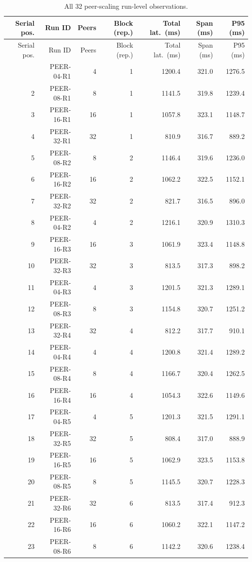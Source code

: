 \begin{longtable}{rrrrrrr}
\caption{All 32 peer-scaling run-level observations.}\label{tab:s7}\\
\toprule
Serial pos. & Run ID & Peers & Block (rep.) & Total lat.\ (ms) & Span (ms) & P95 (ms) \\
\midrule
\endfirsthead
\toprule
Serial pos. & Run ID & Peers & Block (rep.) & Total lat.\ (ms) & Span (ms) & P95 (ms) \\
\midrule
\endhead
\bottomrule
\endfoot
1 & PEER-04-R1 & 4 & 1 & 1200.4 & 321.0 & 1276.5 \\
2 & PEER-08-R1 & 8 & 1 & 1141.5 & 319.8 & 1239.4 \\
3 & PEER-16-R1 & 16 & 1 & 1057.8 & 323.1 & 1148.7 \\
4 & PEER-32-R1 & 32 & 1 & 810.9 & 316.7 & 889.2 \\
5 & PEER-08-R2 & 8 & 2 & 1146.4 & 319.6 & 1236.0 \\
6 & PEER-16-R2 & 16 & 2 & 1062.2 & 322.5 & 1152.1 \\
7 & PEER-32-R2 & 32 & 2 & 821.7 & 316.5 & 896.0 \\
8 & PEER-04-R2 & 4 & 2 & 1216.1 & 320.9 & 1310.3 \\
9 & PEER-16-R3 & 16 & 3 & 1061.9 & 323.4 & 1148.8 \\
10 & PEER-32-R3 & 32 & 3 & 813.5 & 317.3 & 898.2 \\
11 & PEER-04-R3 & 4 & 3 & 1201.5 & 321.3 & 1289.1 \\
12 & PEER-08-R3 & 8 & 3 & 1154.8 & 320.7 & 1251.2 \\
13 & PEER-32-R4 & 32 & 4 & 812.2 & 317.7 & 910.1 \\
14 & PEER-04-R4 & 4 & 4 & 1200.8 & 321.4 & 1289.2 \\
15 & PEER-08-R4 & 8 & 4 & 1166.7 & 320.4 & 1262.5 \\
16 & PEER-16-R4 & 16 & 4 & 1054.3 & 322.6 & 1149.6 \\
17 & PEER-04-R5 & 4 & 5 & 1201.3 & 321.5 & 1291.1 \\
18 & PEER-32-R5 & 32 & 5 & 808.4 & 317.0 & 888.9 \\
19 & PEER-16-R5 & 16 & 5 & 1062.9 & 323.5 & 1153.8 \\
20 & PEER-08-R5 & 8 & 5 & 1145.5 & 320.7 & 1228.3 \\
21 & PEER-32-R6 & 32 & 6 & 813.5 & 317.4 & 912.3 \\
22 & PEER-16-R6 & 16 & 6 & 1060.2 & 322.1 & 1147.2 \\
23 & PEER-08-R6 & 8 & 6 & 1142.2 & 320.6 & 1238.4 \\

\end{longtable}
